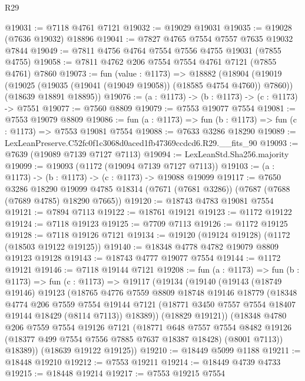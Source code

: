 \begin{lexlean}{R29}
\begin{coremodule}
@19031 := @7118 @4761 @7121
@19032 := @19029 @19031
@19035 := @19028 (@7636 @19032) @18896
@19041 := @7827 @4765 @7554 @7557 @7635 @19032 @7844
@19049 := @7811 @4756 @4764 @7554 @7556 @4755 @19031 (@7855 @4755)
@19058 := @7811 @4762 @206 @7554 @7554 @4761 @7121 (@7855 @4761) @7860
@19073 := fun (value : @1173) =>
  @18882
    (@18904
      (@19019 (@19025 (@19035 (@19041 (@19049 @19058)) (@18585 @4754 @4760)) @7860))
      (@18639 @18891 @18895))
@19076 := (a : @1173) -> (b : @1173) -> (c : @1173) -> @7551
@19077 := @7560 @8809
@19079 := @7553 @19077 @7554
@19081 := @7553 @19079 @8809
@19086 := fun (a : @1173) => fun (b : @1173) => fun (c : @1173) => @7553 @19081 @7554
@19088 := @7633 @3286 @18290
@19089 := LexLeanPreserve.C52fc0f1c3068d0aced1fb47369ccdcd6.R29.__fits_90
@19093 := @7639 (@19089 @7139 @7127 @7113)
@19094 := LexLeanStd.Sha256.majority
@19099 := @19093 (@1172 (@19094 @7139 @7127 @7113))
@19103 := (a : @1173) -> (b : @1173) -> (c : @1173) -> @19088 @19099
@19117 := @7650
    @3286
    @18290
    @19099
    @4785
    @18314
    (@7671 (@7681 @3286))
    (@7687 (@7688 (@7689 @4785) @18290 @7665))
@19120 := @18743 @4783 @19081 @7554
@19121 := @7894 @7113
@19122 := @18761 @19121
@19123 := @1172 @19122
@19124 := @7118 @19123
@19125 := @7709 @7113
@19126 := @1172 @19125
@19128 := @7118 @19126 @7121
@19134 := @19120 (@19124 @19128) (@1172 (@18503 @19122 @19125))
@19140 := @18348 @4778 @4782 @19079 @8809 @19123 @19128
@19143 := @18743 @4777 @19077 @7554
@19144 := @1172 @19121
@19146 := @7118 @19144 @7121
@19208 := fun (a : @1173) =>
  fun (b : @1173) =>
  fun (c : @1173) =>
  @19117
    (@19134
      (@19140
        (@19143
          (@18749 @19146)
          @19123
          (@18765
            @4776
            @7559
            @8809
            @18748
            @19146
            @18779
            (@18348
              @4774
              @206
              @7559
              @7554
              @19144
              @7121
              (@18771 @3450 @7557 @7554 @18407 @19144 @18429 (@8114 @7113))
              @18389))
          (@18829 @19121))
        (@18348
          @4780
          @206
          @7559
          @7554
          @19126
          @7121
          (@18771
            @648
            @7557
            @7554
            @8482
            @19126
            (@18377 @499 @7554 @7556 @7885 @7637 @18387 @18428)
            (@8001 @7113))
          @18389))
      (@18639 @19122 @19125))
@19210 := @18449 @5099 @1188
@19211 := @18448 @19210
@19212 := @7553 @19211
@19214 := @18449 @4739 @4733
@19215 := @18448 @19214
@19217 := @7553 @19215 @7554

\end{coremodule}
\end{lexlean}
